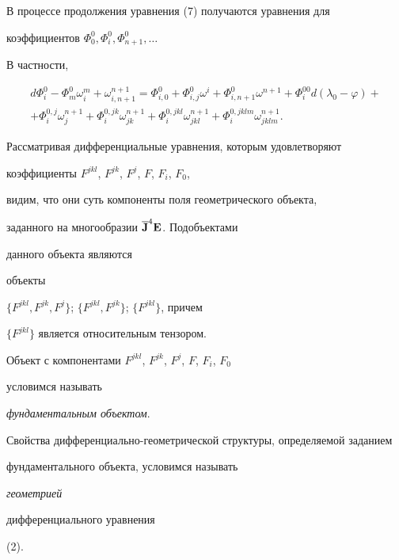 \begin{notes} 


В процессе продолжения уравнения (7) получаются уравнения для 


коэффициентов $\Phi^0_0,\Phi^0_i,\Phi^0_{n+1},\dotsc$ 


В частности,


\begin{multline*} 


d\Phi^0_i-\Phi^0_m\omega^m_i+\omega^{n+1}_{i,n+1}= 


\Phi^0_{i,0}+\Phi^0_{i,j}\omega^i+ 


\Phi^0_{i,n+1}\omega^{n+1}+\Phi^{00}_id(\lambda_0-\varphi)+ \\


+\Phi^{0,j}_i\omega^{n+1}_j+\Phi^{0,jk}_i\omega^{n+1}_{jk}+ 


\Phi^{0,jkl}_i\omega^{n+1}_{jkl}+ 


\Phi^{0,jklm}_i\omega^{n+1}_{jklm}. 


\end{multline*}  


\end{notes} 


 


Рассматривая дифференциальные уравнения, которым удовлетворяют  


коэффициенты $F^{jkl}$, $F^{jk}$, $F^j$, $F$, $F_i$, $F_0$, 


видим, что они суть компоненты поля геометрического объекта,  


заданного на многообразии $\overline{\bold J}^4\bold E$. Подобъектами 


данного объекта являются 


объекты 


$\{F^{jkl},F^{jk},F^j\}$; $\{F^{jkl},F^{jk}\}$; $\{F^{jkl}\}$, причем 


$\{F^{jkl}\}$ является относительным тензором. 


 


Объект с компонентами $F^{jkl}$, $F^{jk}$, $F^j$, $F$, $F_i$, $F_0$ 


условимся называть  


{\it фундаментальным объектом}. 


 


Свойства дифференциально-геометрической структуры, определяемой заданием  


фундаментального объекта, условимся называть {\it геометрией  


дифференциального уравнения} (2). 


